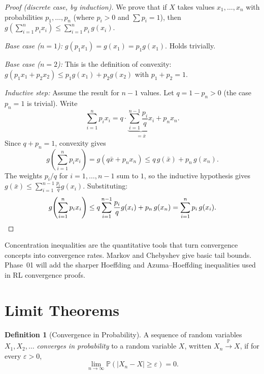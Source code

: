 \documentclass[11pt,a4paper]{article}
\theoremstyle{definition}
\newtheorem{definition}{Definition}[section]
\theoremstyle{plain}
\theoremstyle{remark}
\newcommand{\Prob}{\mathbb{P}}
\begin{document}
\begin{proof}[Proof (discrete case, by induction)]
We prove that if $X$ takes values $x_1, \ldots, x_n$ with probabilities $p_1, \ldots, p_n$
(where $p_i > 0$ and $\sum p_i = 1$), then $g\!\left(\sum_{i=1}^n p_i x_i\right) \leq
\sum_{i=1}^n p_i\,g(x_i)$.

\emph{Base case ($n = 1$):} $g(p_1 x_1) = g(x_1) = p_1 g(x_1)$. Holds trivially.

\emph{Base case ($n = 2$):} This is the definition of convexity:
$g(p_1 x_1 + p_2 x_2) \leq p_1 g(x_1) + p_2 g(x_2)$ with $p_1 + p_2 = 1$.

\emph{Inductive step:} Assume the result for $n - 1$ values. Let $q = 1 - p_n > 0$
(the case $p_n = 1$ is trivial). Write
\[
    \sum_{i=1}^n p_i x_i = q \cdot \underbrace{\sum_{i=1}^{n-1}\frac{p_i}{q}x_i}_{= \bar{x}} + p_n x_n.
\]
Since $q + p_n = 1$, convexity gives
\[
    g\!\left(\sum_{i=1}^n p_i x_i\right) = g(q\bar{x} + p_n x_n)
    \leq q\,g(\bar{x}) + p_n\,g(x_n).
\]
The weights $p_i/q$ for $i = 1, \ldots, n-1$ sum to $1$, so the inductive hypothesis
gives $g(\bar{x}) \leq \sum_{i=1}^{n-1}\frac{p_i}{q}g(x_i)$. Substituting:
\[
    g\!\left(\sum_{i=1}^n p_i x_i\right)
    \leq q \sum_{i=1}^{n-1}\frac{p_i}{q}g(x_i) + p_n\,g(x_n)
    = \sum_{i=1}^n p_i\,g(x_i).
    \qedhere
\]
\end{proof}

\begin{rlconnection}
Concentration inequalities are the quantitative tools that turn convergence concepts into
convergence rates. Markov and Chebyshev give basic tail bounds. Phase~01 will add the
sharper Hoeffding and Azuma--Hoeffding inequalities used in RL convergence proofs.
\end{rlconnection}

\section{Limit Theorems}
\label{sec:limit_theorems}

\begin{definition}[Convergence in Probability]
\label{def:conv_prob}
A sequence of random variables $X_1, X_2, \ldots$ \emph{converges in probability} to a
random variable $X$, written $X_n \xrightarrow{\Prob} X$, if for every $\varepsilon > 0$,
\[
    \lim_{n \to \infty} \Prob(|X_n - X| \geq \varepsilon) = 0.
\]
\end{definition}
\end{document}
